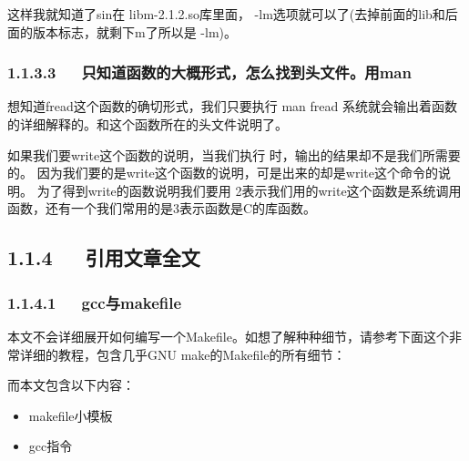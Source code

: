 \documentclass[letterpaper,12pt,english]{sphinxmanual}
\begin{document}
这样我就知道了sin在 libm-2.1.2.so库里面，
-lm选项就可以了(去掉前面的lib和后面的版本标志，就剩下m了所以是 -lm)。

\begin{sphinxVerbatim}[commandchars=\\\{\}]
    
\end{sphinxVerbatim}


\subsubsection{1.1.3.3   只知道函数的大概形式，怎么找到头文件。用man}
\label{\detokenize{001software/001install/make:man}}
想知道fread这个函数的确切形式，我们只要执行 man fread 系统就会输出着函数的详细解释的。和这个函数所在的头文件说明了。

如果我们要write这个函数的说明，当我们执行  时，输出的结果却不是我们所需要的。 因为我们要的是write这个函数的说明，可是出来的却是write这个命令的说明。
为了得到write的函数说明我们要用  2表示我们用的write这个函数是系统调用函数，还有一个我们常用的是3表示函数是C的库函数。


\subsection{1.1.4   引用文章全文}
\label{\detokenize{001software/001install/make:id5}}

\subsubsection{1.1.4.1   gcc与makefile}
\label{\detokenize{001software/001install/make:gccmakefile}}
\begin{DUlineblock}{0em}
\item[] 本文不会详细展开如何编写一个Makefile。如想了解种种细节，请参考下面这个非常详细的教程，包含几乎GNU
make的Makefile的所有细节：
\end{DUlineblock}


而本文包含以下内容：
\begin{itemize}
\item {} 
makefile小模板

\item {} 
gcc指令

\end{itemize}
\end{document}
